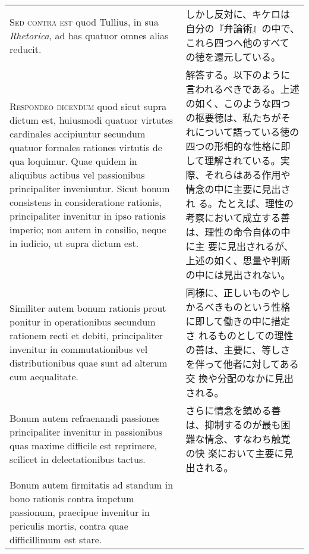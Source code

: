 \documentclass[10pt]{jsarticle}
\begin{document}
\begin{longtable}{p{21em}p{21em}}
 {\scshape Sed contra est} quod Tullius, in sua {\itshape Rhetorica},
 ad has quatuor omnes alias reducit.

 
&

 しかし反対に、キケロは自分の『弁論術』の中で、これら四つへ他のすべて
 の徳を還元している。

 
\\



 {\scshape Respondeo dicendum} quod sicut supra dictum est, huiusmodi
 quatuor virtutes cardinales accipiuntur secundum quatuor formales
 rationes virtutis de qua loquimur. Quae quidem in aliquibus actibus
 vel passionibus principaliter inveniuntur. Sicut bonum consistens in
 consideratione rationis, principaliter invenitur in ipso rationis
 imperio; non autem in consilio, neque in iudicio, ut supra dictum
 est.
 
&

 解答する。以下のように言われるべきである。上述の如く、このような四つ
 の枢要徳は、私たちがそれについて語っている徳の四つの形相的な性格に即
 して理解されている。実際、それらはある作用や情念の中に主要に見出され
 る。たとえば、理性の考察において成立する善は、理性の命令自体の中に主
 要に見出されるが、上述の如く、思量や判断の中には見出されない。

 
\\



 Similiter autem bonum rationis prout ponitur in operationibus
 secundum rationem recti et debiti, principaliter invenitur in
 commutationibus vel distributionibus quae sunt ad alterum cum
 aequalitate.
 
&

 同様に、正しいものやしかるべきものという性格に即して働きの中に措定さ
 れるものとしての理性の善は、主要に、等しさを伴って他者に対してある交
 換や分配のなかに見出される。
 

 
\\

 Bonum autem refraenandi passiones principaliter
 invenitur in passionibus quas maxime difficile est reprimere,
 scilicet in delectationibus tactus.

&

 さらに情念を鎮める善は、抑制するのが最も困難な情念、すなわち触覚の快
 楽において主要に見出される。
 
\\

 Bonum autem firmitatis ad standum
 in bono rationis contra impetum passionum, praecipue invenitur in
 periculis mortis, contra quae difficillimum est stare.
 

\end{longtable}
\end{document}
